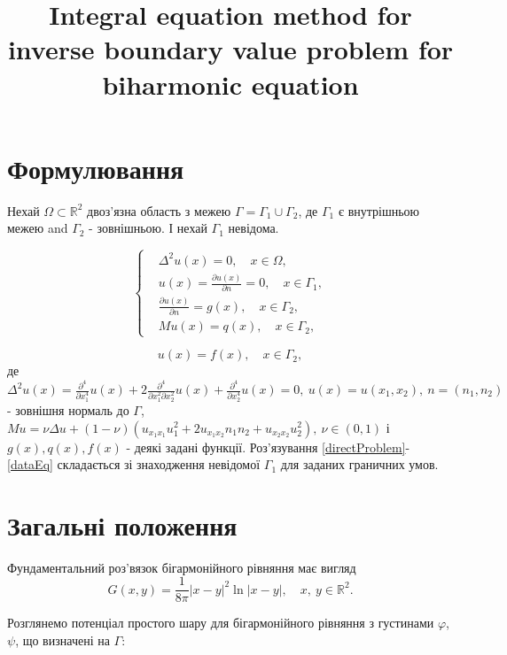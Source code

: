\documentclass[12pt]{article}
\title{Integral equation method for inverse boundary value problem for biharmonic equation}
\date{}
\begin{document}
\maketitle


\section {Формулювання}
Нехай $\Omega\subset \mathbb{R}^2$ двоз'язна область з межею $\Gamma=\Gamma_1\cup\Gamma_2$, де $\Gamma_1$ є внутрішньою межею and $\Gamma_2$ - зовнішньою. І нехай $\Gamma_1$ невідома.

\begin{equation}
	\left\{
	\label{directProblem}
	\begin{split}
		&\Delta^2 u(x)=0, \quad x\in\Omega, \\
		&u(x)=\frac{\partial u(x)}{\partial n}=0, \quad x\in\Gamma_1, \\
		&\frac{\partial u(x)}{\partial n}=g(x), \quad x\in\Gamma_2, \\
		&Mu(x)=q(x), \quad x\in\Gamma_2,
	\end{split}
	\right.
\end{equation}

\begin{equation}
	\label{dataEq}
	u(x)=f(x), \quad x\in\Gamma_2,
\end{equation}
де $\Delta^{2}u(x)=\frac{\partial^{4}}{\partial x_1^4}u(x)+2\frac{\partial^{4}}{\partial x_1^2\partial x_2^2}u(x)+\frac{\partial^{4}}{\partial x_2^4}u(x)=0,\ u(x)=u(x_1,x_2), \ n=(n_1, n_2)$ - зовнішня нормаль до $\Gamma$, $Mu=\nu\Delta u+(1-\nu)(u_{x_1 x_1}u_1^2+2u_{x_1 x_2}n_1 n_2+u_{x_2 x_2}u_2^2), \ \nu\in (0, 1)$ і $g(x),q(x),f(x)$ - деякі задані функції. Роз'язування \eqref{directProblem}-\eqref{dataEq} складається зі знаходження невідомої $\Gamma_1$ для заданих граничних умов.


\section {Загальні положення}

Фундаментальний роз'вязок бігармонійного рівняння має вигляд
 \begin{equation}
 	G(x, y)=\frac{1}{8\pi}|x-y|^2\ln|x-y|, \quad x,\ y \in \mathbb{R}^2.
 \end{equation}

Розглянемо потенціал простого шару для бігармонійного рівняння з густинами $\varphi$, $\psi$, що визначені на $\Gamma$:
\end{document}
